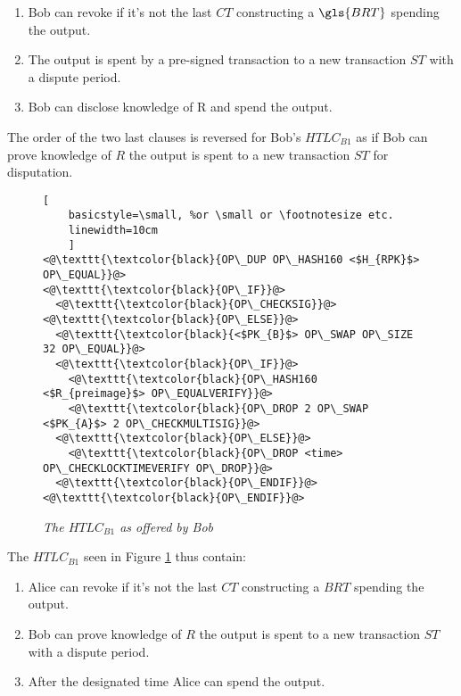 \begin{enumerate}
	\item Bob can revoke if it's not the last $CT$ constructing a $\gls{BRT}$ spending the output.
	\item The output is spent by a pre-signed transaction to a new transaction $ST$ with a dispute period.
	\item Bob can disclose knowledge of R and spend the output.
\end{enumerate}

The order of the two last clauses is reversed for Bob's $HTLC_{B1}$ as if Bob can prove knowledge of $R$ the output is spent to a new transaction $ST$ for disputation.

\begin{figure}[hbt!]
	
	\centering
	
	\begin{lstlisting}[
	basicstyle=\small, %or \small or \footnotesize etc.
	linewidth=10cm
	]
<@\texttt{\textcolor{black}{OP\_DUP OP\_HASH160 <$H_{RPK}$> OP\_EQUAL}}@>
<@\texttt{\textcolor{black}{OP\_IF}}@>
  <@\texttt{\textcolor{black}{OP\_CHECKSIG}}@>
<@\texttt{\textcolor{black}{OP\_ELSE}}@>
  <@\texttt{\textcolor{black}{<$PK_{B}$> OP\_SWAP OP\_SIZE 32 OP\_EQUAL}}@>
  <@\texttt{\textcolor{black}{OP\_IF}}@>
    <@\texttt{\textcolor{black}{OP\_HASH160 <$R_{preimage}$> OP\_EQUALVERIFY}}@> 
    <@\texttt{\textcolor{black}{OP\_DROP 2 OP\_SWAP <$PK_{A}$> 2 OP\_CHECKMULTISIG}}@>  
  <@\texttt{\textcolor{black}{OP\_ELSE}}@> 
    <@\texttt{\textcolor{black}{OP\_DROP <time> OP\_CHECKLOCKTIMEVERIFY OP\_DROP}}@> 	
  <@\texttt{\textcolor{black}{OP\_ENDIF}}@>
<@\texttt{\textcolor{black}{OP\_ENDIF}}@>
	\end{lstlisting}
	
	\caption{\textit{ The $HTLC_{B1}$ as offered by Bob
	}}
	\label{fig:bob:HTLC}
\end{figure}

The $HTLC_{B1}$ seen in Figure \ref{fig:bob:HTLC} thus contain:

\begin{enumerate}
	\item Alice can revoke if it's not the last $CT$ constructing a $BRT$ spending the output.
	\item Bob can prove knowledge of $R$ the output is spent to a new transaction $ST$ with a dispute period.
	\item After the designated time Alice can spend the output.
\end{enumerate}

